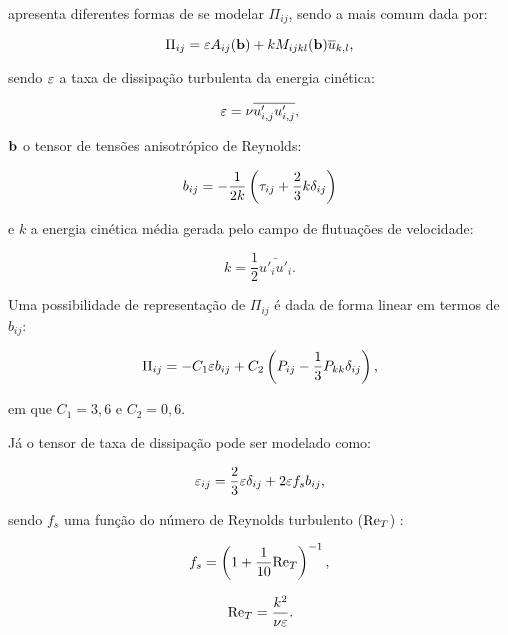 \documentclass[_ArquivoPrincipal.tex]{subfiles}
\begin{document}
 apresenta diferentes formas de se modelar $\Pi_{ij}$, sendo a mais comum dada por:

\begin{equation}
    \Pi_{ij}=\varepsilon A_{ij}(\mathbf{b})+kM_{ijkl}(\mathbf{b})\overline{u}_{k,l}\text{,}
\end{equation}

\noindent sendo $\varepsilon$ a taxa de dissipação turbulenta da energia cinética:

\begin{equation}
    \varepsilon=\nu\overline{u'_{i,j}u'_{i,j}}\text{,}
\end{equation}

\noindent $\mathbf{b}$ o tensor de tensões anisotrópico de Reynolds:

\begin{equation}
    b_{ij}=-\frac{1}{2k}\left({\tau_{ij}+\frac{2}{3}k\delta_{ij}}\right)
\end{equation}

\noindent e $k$ a energia cinética média gerada pelo campo de flutuações de velocidade:

\begin{equation}
    k=\frac{1}{2}\bar{u'_iu'_i}\text{.}
\end{equation}

Uma possibilidade de representação de $\Pi_{ij}$ é dada de forma linear em termos de $b_{ij}$:

\begin{equation}
    \Pi_{ij}=-C_1\varepsilon b_{ij}+C_2\left({P_{ij}-\frac{1}{3}P_{kk}\delta_{ij}}\right)\text{,}
\end{equation}

\noindent em que $C_1=3,6$ e $C_2=0,6$.

Já o tensor de taxa de dissipação pode ser modelado como:

\begin{equation}
    \varepsilon_{ij}=\frac{2}{3}\varepsilon\delta_{ij}+2\varepsilon f_s b_{ij}\text{,}
\end{equation}

\noindent sendo $f_s$ uma função do número de Reynolds turbulento ($\mathrm{Re}_T$) \cite{hanjalic1976contribution}:

\begin{equation}
    f_s=\left({1+\frac{1}{10}\mathrm{Re}_T}\right)^{-1}\text{,}
\end{equation}

\begin{equation}
    \mathrm{Re}_T=\frac{k^2}{\nu\varepsilon}\text{.}
\end{equation}
\end{document}

